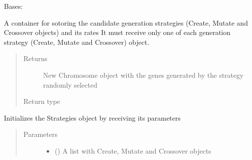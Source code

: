 \documentclass[letterpaper,10pt,english]{sphinxmanual}
\begin{document}
\begin{fulllineitems}
\label{\detokenize{genetic:genetic.Strategies}}
\sphinxAtStartPar
Bases: 

\sphinxAtStartPar
A container for sotoring the candidate generation strategies (Create, Mutate and Crossover objects) and its rates
It must receive only one of each generation strategy (Create, Mutate and Crossover) object.
\begin{quote}\begin{description}
\item[{Returns}] \leavevmode
\sphinxAtStartPar
New Chromosome object with the genes generated by the strategy randomly selected

\item[{Return type}] \leavevmode
\sphinxAtStartPar
{\hyperref[\detokenize{genetic:genetic.Chromosome}]{}}

\end{description}\end{quote}

\sphinxAtStartPar
Initializes the Strategies object by receiving its parameters
\begin{quote}\begin{description}
\item[{Parameters}] \leavevmode\begin{itemize}
\item {} 
\sphinxAtStartPar
{} (\sphinxstyleliteralemphasis{\sphinxupquote{{[}}}{\hyperref[\detokenize{genetic:genetic.Create}]{\sphinxcrossref{\sphinxstyleliteralemphasis{\sphinxupquote{Create}}}}}\sphinxstyleliteralemphasis{\sphinxupquote{{]}}}) \textendash{} A list with Create, Mutate and Crossover objects


\end{itemize}
\end{description}
\end{quote}
\end{fulllineitems}
\end{document}
